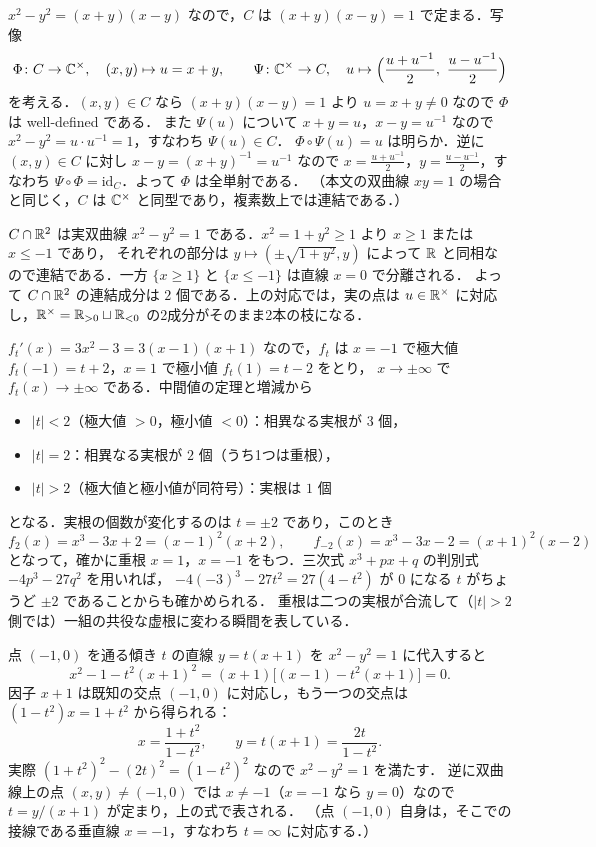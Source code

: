 $x^2-y^2=(x+y)(x-y)$ なので，$C$ は $(x+y)(x-y)=1$ で定まる．写像
\[
  \Phi\colon C\to\C^\times,\quad (x,y)\mapsto u=x+y,\qquad
  \Psi\colon\C^\times\to C,\quad u\mapsto\Bigl(\frac{u+u^{-1}}2,\ \frac{u-u^{-1}}2\Bigr)
\]
を考える．$(x,y)\in C$ なら $(x+y)(x-y)=1$ より $u=x+y\ne0$ なので $\Phi$ は well-defined である．
また $\Psi(u)$ について $x+y=u$，$x-y=u^{-1}$ なので $x^2-y^2=u\cdot u^{-1}=1$，すなわち $\Psi(u)\in C$．
$\Phi\circ\Psi(u)=u$ は明らか．逆に $(x,y)\in C$ に対し $x-y=(x+y)^{-1}=u^{-1}$ なので
$x=\frac{u+u^{-1}}2$，$y=\frac{u-u^{-1}}2$，すなわち $\Psi\circ\Phi=\mathrm{id}_C$．よって $\Phi$ は全単射である．
（本文の双曲線 $xy=1$ の場合と同じく，$C$ は $\mathbb{C}^\times$ と同型であり，複素数上では連結である．）

$C\cap\mathbb{R}^2$ は実双曲線 $x^2-y^2=1$ である．$x^2=1+y^2\ge1$ より $x\ge1$ または $x\le-1$ であり，
それぞれの部分は $y\mapsto(\pm\sqrt{1+y^2},y)$ によって $\mathbb{R}$ と同相なので連結である．一方 $\{x\ge1\}$ と $\{x\le-1\}$ は直線 $x=0$ で分離される．
よって $C\cap\mathbb{R}^2$ の連結成分は $2$ 個である．上の対応では，実の点は $u\in\mathbb{R}^\times$ に対応し，$\mathbb{R}^\times=\mathbb{R}_{>0}\sqcup\mathbb{R}_{<0}$ の2成分がそのまま2本の枝になる．

$f_t'(x)=3x^2-3=3(x-1)(x+1)$ なので，$f_t$ は $x=-1$ で極大値 $f_t(-1)=t+2$，$x=1$ で極小値 $f_t(1)=t-2$ をとり，
$x\to\pm\infty$ で $f_t(x)\to\pm\infty$ である．中間値の定理と増減から
\begin{itemize}
  \item $|t|<2$（極大値 $>0$，極小値 $<0$）：相異なる実根が $3$ 個，
  \item $|t|=2$：相異なる実根が $2$ 個（うち1つは重根），
  \item $|t|>2$（極大値と極小値が同符号）：実根は $1$ 個
\end{itemize}
となる．実根の個数が変化するのは $t=\pm2$ であり，このとき
\[
  f_2(x)=x^3-3x+2=(x-1)^2(x+2),\qquad f_{-2}(x)=x^3-3x-2=(x+1)^2(x-2)
\]
となって，確かに重根 $x=1$，$x=-1$ をもつ．三次式 $x^3+px+q$ の判別式 $-4p^3-27q^2$ を用いれば，
$-4(-3)^3-27t^2=27(4-t^2)$ が $0$ になる $t$ がちょうど $\pm2$ であることからも確かめられる．
重根は二つの実根が合流して（$|t|>2$ 側では）一組の共役な虚根に変わる瞬間を表している．

点 $(-1,0)$ を通る傾き $t$ の直線 $y=t(x+1)$ を $x^2-y^2=1$ に代入すると
\[
  x^2-1-t^2(x+1)^2=(x+1)\bigl[(x-1)-t^2(x+1)\bigr]=0.
\]
因子 $x+1$ は既知の交点 $(-1,0)$ に対応し，もう一つの交点は $(1-t^2)x=1+t^2$ から得られる：
\[
  x=\frac{1+t^2}{1-t^2},\qquad y=t(x+1)=\frac{2t}{1-t^2}.
\]
実際 $(1+t^2)^2-(2t)^2=(1-t^2)^2$ なので $x^2-y^2=1$ を満たす．
逆に双曲線上の点 $(x,y)\ne(-1,0)$ では $x\ne-1$（$x=-1$ なら $y=0$）なので $t=y/(x+1)$ が定まり，上の式で表される．
（点 $(-1,0)$ 自身は，そこでの接線である垂直線 $x=-1$，すなわち $t=\infty$ に対応する．）

